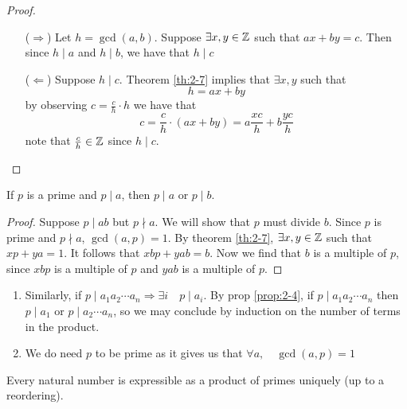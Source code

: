 \documentclass{article}
\begin{document}
\begin{proof}\leavevmode
    \begin{enumerate}
        \item[($\Rightarrow$)] Let $h = \gcd(a, b)$. Suppose $\exists x, y \in \mathbb{Z}$ such that $ax + by = c$. Then since $h \mid a$ and $h \mid b$, we have that $h \mid c$ 
        \item[($\Leftarrow$)] Suppose $h \mid c$. Theorem \ref{th:2-7} implies that $\exists x, y$ such that
        \[
            h = ax + by
        \]
        by observing $c = \frac{c}{h} \cdot h$ we have that
        \[
            c = \frac{c}{h} \cdot (ax + by) = a \frac{xc}{h} + b \frac{yc}{h} 
        \]
        note that $\frac{c}{h} \in \mathbb{Z}$ since $h \mid c$.
    \end{enumerate}
\end{proof}

\begin{prop}
    If $p$ is a prime and $p \mid a$, then $p \mid a$ or $p \mid b$.
\end{prop}

\begin{proof}
    Suppose $p \mid ab$ but $p \nmid a$. We will show that $p$ must divide $b$. 
    Since $p$ is prime and $p \nmid a$, $\gcd(a, p) = 1$. By theorem \ref{th:2-7}, $\exists x, y \in \mathbb{Z}$ such that $xp + ya = 1$.
    It follows that $xbp + yab = b$. Now we find that $b$ is a multiple of $p$, since $xbp$ is a multiple of $p$ and $yab$ is a multiple of $p$.
\end{proof}

\begin{remark}
    \begin{enumerate}
        \item Similarly, if $p \mid a_1a_2\cdots a_n \Rightarrow \exists i \quad p \mid a_i$. By prop \ref{prop:2-4}, if $p \mid a_1a_2\cdots a_n$ then $p \mid a_1$ or $p \mid a_2\cdots a_n$, so we may conclude by induction on the number of terms in the product.
        \item We do need $p$ to be prime as it gives us that $\forall a, \quad \gcd(a, p) = 1$
    \end{enumerate}
\end{remark}

\begin{nthm}\label{th:2-29}
    Every natural number is expressible as a product of primes uniquely (up to a reordering).
\end{nthm}
\end{document}
